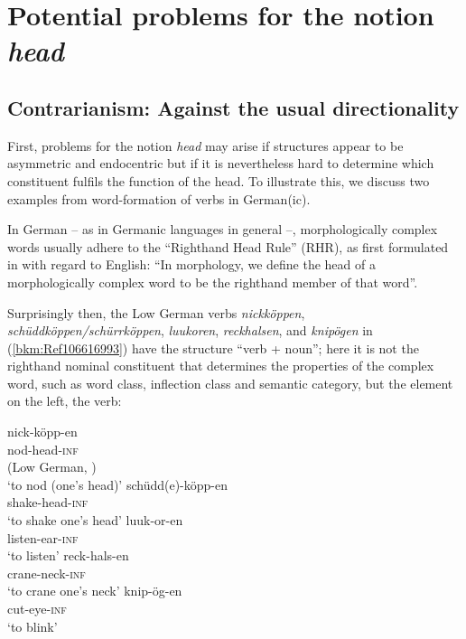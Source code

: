 \documentclass[output=paper
  ,nobabel
  ,draftmode
  ,colorlinks, citecolor=brown
]{langscibook}
\begin{document}
\section{Potential problems for the notion \emph{head}}

\subsection{Contrarianism: Against the usual directionality} 

First, problems for the notion \emph{head} may arise if structures appear to be asymmetric and
endocentric but if it is nevertheless hard to determine which constituent fulfils the function of
the head. To illustrate this, we discuss two examples from word-formation of verbs in German(ic).

In German – as in Germanic languages in general –, morphologically complex words usually adhere to
the “Righthand Head Rule'' (RHR), as first formulated in \citet[248]{Williams1981} with regard to
English: “In morphology, we define the head of a morphologically complex word to be the righthand
member of that word''.

Surprisingly then, the Low German verbs \emph{nickköppen}, \emph{schüddköppen/schürrköppen},
\emph{luukoren}, \emph{reckhalsen}, and \emph{knipögen} in (\ref{bkm:Ref106616993}) have the
structure “verb + noun''; here it is not the righthand nominal constituent that determines the
properties of the complex word, such as word class, inflection class and semantic category, but the
element on the left, the verb:

\eal
\label{bkm:Ref106388120}\label{bkm:Ref106616993}
\ex
\gll nick-köpp-en\\
     nod-head-\textsc{inf} \\\hfill(Low German, \citealt[50--52]{AsdahlHolmberg1973})\\
\glt `to nod (one's head)'
\ex
\gll schüdd(e)-köpp-en\\
     shake-head-\textsc{inf} \\
\glt `to shake one's head'
\ex
\gll luuk-or-en\\
       listen-ear-\textsc{inf} \\
\glt   `to listen'
\ex 
\gll reck-hals-en\\
       crane-neck-\textsc{inf} \\
\glt   `to crane one's neck'
\ex
\gll knip-ög-en\\
       cut-eye-\textsc{inf} \\
\glt   `to blink'
\zl
\end{document}
